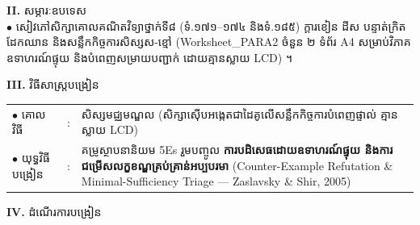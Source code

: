 \documentclass[a4paper,10pt]{article}
\newcommand{\en}[1]{{\TimesEn #1}}
\begin{document}
{\vspace{1pt}

\textbf{II.} {\muol សម្ភារៈឧបទេស}\\[1pt]
\hspace*{0.55cm}$\bullet$ \hspace{0.35cm} សៀវភៅសិក្សាគោលគណិតវិទ្យាថ្នាក់ទី៨ (ទំ.១៧១--១៧៤ និងទំ.១៨៥) ក្ដារខៀន ដីស បន្ទាត់ក្រិត ដែកឈាន និងសន្លឹកកិច្ចការសិស្សស-ខ្មៅ (\en{Worksheet\_PARA2} ចំនួន ២ ទំព័រ \en{A4} សម្រាប់វិភាគឧទាហរណ៍ផ្ទុយ និងបំពេញសម្រាយបញ្ជាក់ ដោយគ្មានស្លាយ \en{LCD}) ។

\vspace{1pt}

\textbf{III.} {\muol វិធីសាស្រ្តបង្រៀន}\\[1pt]
\hspace*{0.45cm}%
\begin{tabular}{@{}l l L{14.85cm}@{}}
  $\bullet$ \hspace{0.25cm} គោលវិធី & : & សិស្សមជ្ឈមណ្ឌល (សិក្សាស៊ើបអង្កេតជាដៃគូលើសន្លឹកកិច្ចការបំពេញផ្ទាល់ គ្មានស្លាយ \en{LCD}) \\
  $\bullet$ \hspace{0.25cm} យុទ្ធវិធីបង្រៀន & : & គម្រូស្ថាបនានិយម \en{5Es} រួមបញ្ចូល \textbf{ការបដិសេធដោយឧទាហរណ៍ផ្ទុយ និងការជម្រើសលក្ខខណ្ឌគ្រប់គ្រាន់អប្បបរមា} (\en{Counter-Example Refutation \& Minimal-Sufficiency Triage — Zaslavsky \& Shir, 2005}) \\
\end{tabular}
}

\vspace{1pt}

\textbf{IV.} {\muol ដំណើរការបង្រៀន}

\vspace{1pt}
\end{document}

